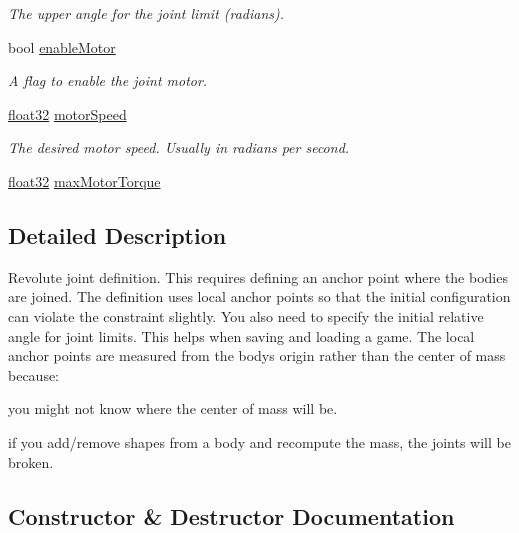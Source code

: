 \begin{DoxyCompactItemize}
\begin{DoxyCompactList}\small\item\em The upper angle for the joint limit (radians). \end{DoxyCompactList}\item 
bool \mbox{\hyperlink{structb2_revolute_joint_def_aa94d9e66be9f03818d0cfbd9c70b2996}{enable\+Motor}}
\begin{DoxyCompactList}\small\item\em A flag to enable the joint motor. \end{DoxyCompactList}\item 
\mbox{\hyperlink{b2_settings_8h_aacdc525d6f7bddb3ae95d5c311bd06a1}{float32}} \mbox{\hyperlink{structb2_revolute_joint_def_aced7cf768f4dcc3561576a39c7b92ec4}{motor\+Speed}}
\begin{DoxyCompactList}\small\item\em The desired motor speed. Usually in radians per second. \end{DoxyCompactList}\item 
\mbox{\hyperlink{b2_settings_8h_aacdc525d6f7bddb3ae95d5c311bd06a1}{float32}} \mbox{\hyperlink{structb2_revolute_joint_def_a9fc1b67fe6d1bc31f88cc2cfd681fe30}{max\+Motor\+Torque}}
\end{DoxyCompactItemize}


\subsection{Detailed Description}
Revolute joint definition. This requires defining an anchor point where the bodies are joined. The definition uses local anchor points so that the initial configuration can violate the constraint slightly. You also need to specify the initial relative angle for joint limits. This helps when saving and loading a game. The local anchor points are measured from the body\textquotesingle{}s origin rather than the center of mass because\+:
\begin{DoxyEnumerate}
\item you might not know where the center of mass will be.
\item if you add/remove shapes from a body and recompute the mass, the joints will be broken. 
\end{DoxyEnumerate}

\subsection{Constructor \& Destructor Documentation}
\mbox{\label{structb2_revolute_joint_def_a20296c13c3102d03eb8787e463ff63d1}} 
